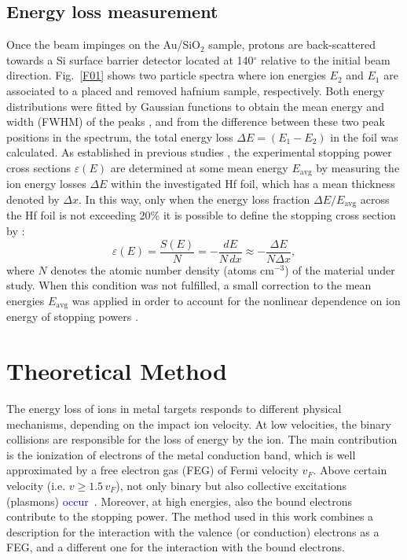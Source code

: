 \documentclass[aps,pra,reprint,superscriptaddress]{revtex4-1}
\def\ale#1{\textcolor{blue}{#1}}
\begin{document}
\subsection{Energy loss measurement}
Once the beam impinges on the Au/SiO$_2$ sample, protons are 
back-scattered towards a Si surface barrier detector located at 
140$^{\circ}$ relative to the initial beam direction. Fig.~\ref{F01} 
shows two particle spectra where ion energies $E_2$ and $E_1$ are 
associated to a placed and removed hafnium sample, respectively. Both 
energy distributions were fitted by Gaussian functions to obtain the 
mean energy and width (FWHM) of the peaks \cite{Sun01}, and from the 
difference between these two peak positions in the spectrum, the total 
energy loss $\Delta E = (E_1 - E_2)$ in the foil was calculated. As 
established in previous studies \cite{Miranda01,Damache02}, the 
experimental stopping power cross sections $\varepsilon (E) $ are 
determined at some mean energy $E_{\mathrm{avg}}$ by measuring the ion 
energy losses $\Delta E$ within the investigated Hf foil, which has a 
mean thickness denoted by $\Delta x$. In this way, only when the energy 
loss fraction $\Delta E/E_{\mathrm{avg}}$ across the Hf foil is not 
exceeding 20\% it is possible to define the stopping cross section by 
\cite{Raisanen01,Schulz01}:
\begin{equation}\label{eq:stcross}
 \varepsilon(E)=\frac{S(E)}{N}=-\frac{dE}{N\,dx}\approx-\frac{\Delta E}{N\Delta x},
\end{equation}
where $N$ denotes the atomic number density (atoms cm$^{-3}$) of the 
material under study. When this condition was not fulfilled, a small 
correction to the mean energies $E_{\mathrm{avg}}$ was applied in order 
to account for the nonlinear dependence on ion energy of stopping 
powers \cite{Chilton,Rajatora}.


\section{Theoretical Method} 
\label{theory}
The energy loss of ions in metal targets responds to different physical 
mechanisms, depending on the impact ion velocity. At low velocities, the 
binary collisions are responsible for the loss of energy by the ion. 
The main contribution is the ionization of electrons of the metal 
conduction band, which is well approximated by a free electron gas (FEG) 
of Fermi velocity $v_F$. Above certain velocity (i.e. $v\geq 1.5\,v_F$), 
not only binary but also collective excitations (plasmons) 
\ale{occur}~\cite{mon17}. Moreover, at high energies, also the bound electrons 
contribute to the stopping power. The method used in this work combines 
a description for the interaction with the valence (or conduction) 
electrons as a FEG, and a different one for the interaction with the 
bound electrons.
\end{document}
